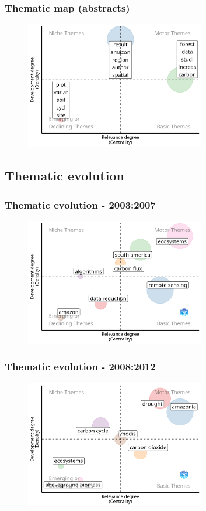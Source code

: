 \documentclass[aspectratio=169]{beamer}
\begin{document}
\begin{frame}
	\frametitle{Thematic map (abstracts)}
	\begin{figure}
		\centering
		\includegraphics[width=0.7\textwidth]
        {figures/thematic_map_abstracts.png}
	\end{figure}
\end{frame}


\subsection{Thematic evolution}


\begin{frame}
	\frametitle{Thematic evolution - 2003:2007}
    \begin{figure}
        \centering
        \includegraphics[width=0.7\textwidth]{figures/thematic_evolution_1.png}
    \end{figure}
\end{frame}

\begin{frame}
	\frametitle{Thematic evolution - 2008:2012}
    \begin{figure}
        \centering
        \includegraphics[width=0.7\textwidth]{figures/thematic_evolution_2.png}
    \end{figure}
\end{frame}
\end{document}
